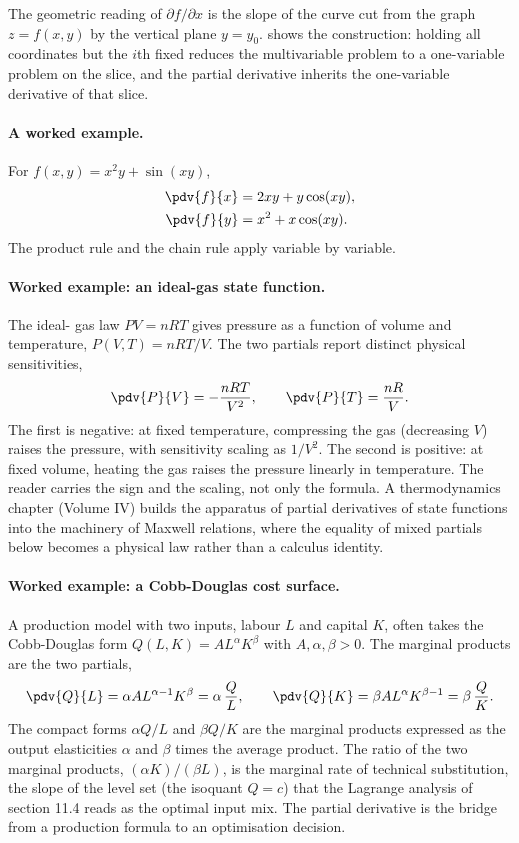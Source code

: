 The geometric reading of $\partial f / \partial x$ is the slope of
the curve cut from the graph $z = f(x, y)$ by the vertical plane
$y = y_{0}$.  shows the
construction: holding all coordinates but the $i$th fixed reduces
the multivariable problem to a one-variable problem on the slice,
and the partial derivative inherits the one-variable derivative of
that slice.



\paragraph{A worked example.} For $f(x, y) = x^{2} y + \sin(xy)$,
\begin{align*}
\pdv{f}{x} &= 2 x y + y \cos(xy), \\
\pdv{f}{y} &= x^{2} + x \cos(xy).
\end{align*}
The product rule and the chain rule apply variable by variable.

\paragraph{Worked example: an ideal-gas state function.} The ideal-
gas law $PV = nRT$ gives pressure as a function of volume and
temperature, $P(V, T) = nRT/V$. The two partials report distinct
physical sensitivities,
\[
\pdv{P}{V} = -\frac{nRT}{V^{2}}, \qquad
\pdv{P}{T} = \frac{nR}{V}.
\]
The first is negative: at fixed temperature, compressing the gas
(decreasing $V$) raises the pressure, with sensitivity scaling as
$1/V^{2}$. The second is positive: at fixed volume, heating the gas
raises the pressure linearly in temperature. The reader carries the
sign and the scaling, not only the formula. A thermodynamics chapter
(Volume IV) builds the apparatus of partial derivatives of state
functions into the machinery of Maxwell relations, where the
equality of mixed partials below becomes a physical law rather than
a calculus identity.

\paragraph{Worked example: a Cobb-Douglas cost surface.} A
production model with two inputs, labour $L$ and capital $K$, often
takes the Cobb-Douglas form $Q(L, K) = A L^{\alpha} K^{\beta}$ with
$A, \alpha, \beta > 0$. The marginal products are the two partials,
\[
\pdv{Q}{L} = \alpha A L^{\alpha - 1} K^{\beta}
= \alpha\,\frac{Q}{L}, \qquad
\pdv{Q}{K} = \beta A L^{\alpha} K^{\beta - 1}
= \beta\,\frac{Q}{K}.
\]
The compact forms $\alpha Q/L$ and $\beta Q/K$ are the marginal
products expressed as the output elasticities $\alpha$ and $\beta$
times the average product. The ratio of the two marginal products,
$(\alpha K)/(\beta L)$, is the marginal rate of technical
substitution, the slope of the level set (the isoquant $Q = c$) that
the Lagrange analysis of section 11.4 reads as the optimal input
mix. The partial derivative is the bridge from a production formula
to an optimisation decision.

